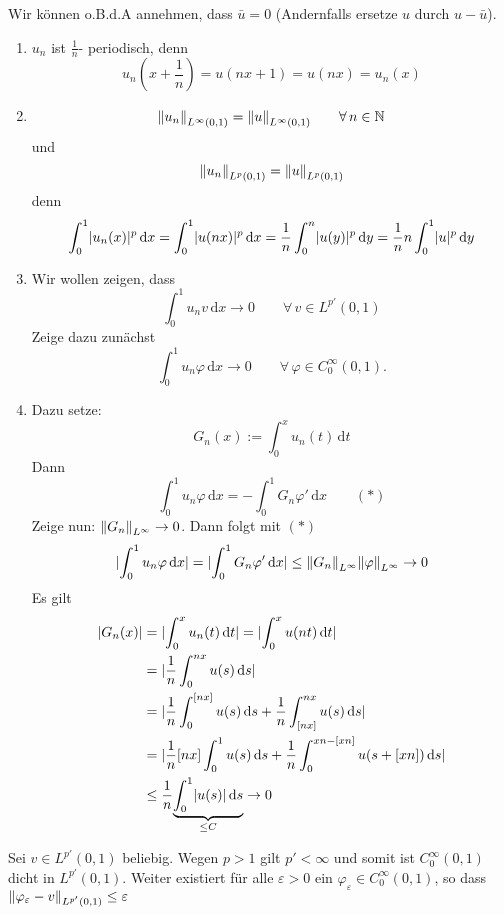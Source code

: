 \begin{beweis}[Für $p >1$]
	Wir können o.B.d.A annehmen, dass $\bar{u}=0$ (Andernfalls ersetze $u$ durch $u-\bar{u}$).
	\begin{enumerate}[(1)]
		\item $u_n$ ist $\frac{1}{n}$- periodisch, denn
		\[
			u_n(x+\frac{1}{n})= u(nx+1) = u(nx) = u_n(x)
		\]
		\item \[
			\norm{u_n}_{L^{\infty}(0,1)} = \norm{u}_{L^{\infty}(0,1)} \qquad \forall\, n \in \mathbb{N}
		\]und 
		\[
			\norm{u_n}_{L^p(0,1)} = \norm{u}_{L^p(0,1)}
		\] denn
		\[
			\int_{0}^{1} \lvert u_n(x)\rvert^p \,\mathrm{d}x = \int_{0}^{1} \lvert u(nx)\rvert^p \,\mathrm{d}x = \frac{1}{n} \int_{0}^{n} \lvert u(y)\rvert^p \,\mathrm{d}y  
		= \frac{1}{n}n \int_{0}^{1}\lvert u\rvert^p \,\mathrm{d}y
		\]
		\item Wir wollen zeigen, dass 
		\[
			\int_{0}^{1}u_n v \,\mathrm{d}x \to 0 \qquad \forall\, v \in L^{p'}(0,1)
		\]
		Zeige dazu zunächst
		\[
			\int_{0}^{1}u_n \varphi \,\mathrm{d}x \to 0 \qquad \forall\, \varphi \in C_0^{\infty}(0,1).
		\]
		\item Dazu setze:
		\[
			G_n(x) := \int_{0}^{x}u_n(t) \,\mathrm{d}t
		\]
		Dann
		\[
			\int_{0}^{1}u_n \varphi \,\mathrm{d}x = - \int_{0}^{1} G_n \varphi' \,\mathrm{d}x \qquad (*)
		\]
		Zeige nun: $\norm{G_n}_{L^{\infty}} \to 0$. Dann folgt mit $(*)$
		\[
			\abs{\int_{0}^{1} u_n \varphi \,\mathrm{d}x} = \abs{\int_{0}^{1} G_n \varphi' \,\mathrm{d}x } \leq \norm{G_n}_{L^{\infty}} \norm{\varphi}_{L^{\infty}} \to 0
		\]
		Es gilt
		\begin{align*}
			\lvert G_n(x)\rvert &= \lvert\int_{0}^{x}u_n(t) \,\mathrm{d}t\rvert = \lvert\int_{0}^{x} u(nt) \,\mathrm{d}t\rvert \\
			&= \lvert\frac{1}{n} \int_{0}^{nx} u(s) \,\mathrm{d}s\rvert \\
			&= \lvert \frac{1}{n} \int_{0}^{[nx]} u(s) \,\mathrm{d}s + \frac{1}{n} \int_{[nx]}^{nx} u(s) \,\mathrm{d}s\rvert \\
			&= \lvert\frac{1}{n} [nx] \int_{0}^{1} u(s) \,\mathrm{d}s + \frac{1}{n} \int_{0}^{xn -[xn]} u(s+ [xn]) \,\mathrm{d}s\rvert \\
			&\leq \frac{1}{n} \underset{\leq C}{\underbrace{\int_{0}^{1} \lvert u(s)\rvert \,\mathrm{d}s}} \to 0
		\end{align*}
	\end{enumerate}
	Sei $v \in L^{p'}(0,1)$ beliebig. Wegen $p>1$ gilt $p'<\infty$ und somit ist $C^{\infty}_0(0,1)$ dicht in $L^{p'}(0,1)$. Weiter existiert für alle $\varepsilon >0$ ein $\varphi _{\varepsilon} \in C^{\infty}_0(0,1)$, so dass $\norm{ \varphi _{\varepsilon} - v}_{L^{p'}(0,1)} \leq \varepsilon$

\end{beweis}
